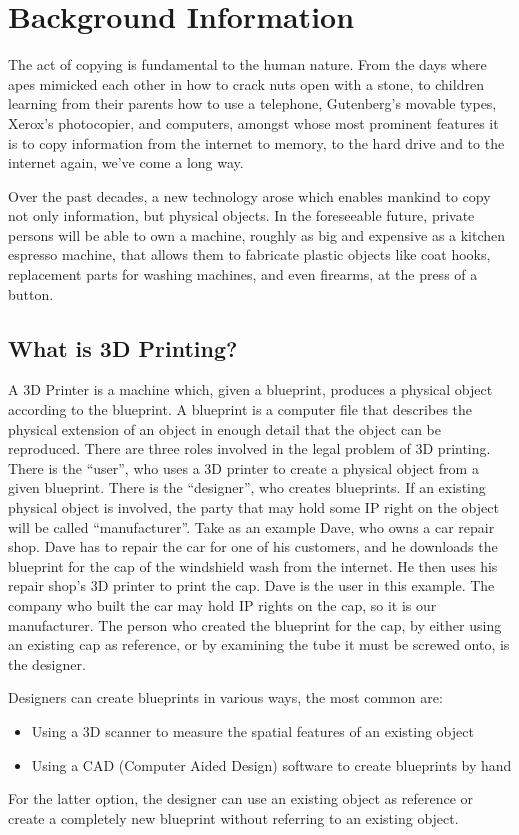 \section{Background Information}

The act of copying is fundamental to the human nature.
From the days where apes mimicked each other in how to crack nuts open with a stone, to children learning from their parents how to use a telephone, Gutenberg’s movable types, Xerox’s photocopier, and computers, amongst whose most prominent features it is to copy information from the internet to memory, to the hard drive and to the internet again, we’ve come a long way.

Over the past decades, a new technology arose which enables mankind to copy not only information, but physical objects.
In the foreseeable future, private persons will be able to own a machine, roughly as big and expensive as a kitchen espresso machine, that allows them to fabricate plastic objects like coat hooks, replacement parts for washing machines, and even firearms, at the press of a button.

\subsection{What is 3D Printing?}
A 3D Printer is a machine which, given a blueprint, produces a physical object according to the blueprint.
A blueprint is a computer file that describes the physical extension of an object in enough detail that the object can be reproduced.
There are three roles involved in the legal problem of 3D printing.
There is the ``user'', who uses a 3D printer to create a physical object from a given blueprint. There is the ``designer'', who creates blueprints.
If an existing physical object is involved, the party that may hold some IP right on the object will be called ``manufacturer''.
Take as an example Dave, who owns a car repair shop.
Dave has to repair the car for one of his customers, and he downloads the blueprint for the cap of the windshield wash from the internet.
He then uses his repair shop’s 3D printer to print the cap.
Dave is the user in this example.
The company who built the car may hold IP rights on the cap, so it is our manufacturer.
The person who created the blueprint for the cap, by either using an existing cap as reference, or by examining the tube it must be screwed onto, is the designer.

Designers can create blueprints in various ways, the most common are:
\begin{itemize}
  \item Using a 3D scanner to measure the spatial features of an existing object
  \item Using a CAD (Computer Aided Design) software to create blueprints by hand
\end{itemize}
For the latter option, the designer can use an existing object as reference or create a completely new blueprint without referring to an existing object.

